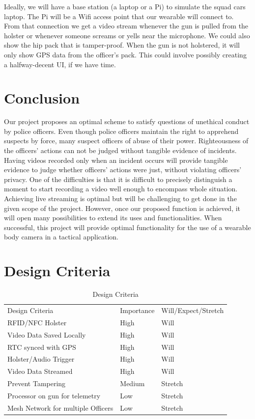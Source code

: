 \documentclass[12pt]{article}
\begin{document}
Ideally, we will have a base station (a laptop or a Pi) to simulate the squad
cars laptop. The Pi will be a Wifi access point that our wearable will connect
to. From that connection we get a video stream whenever the gun is pulled from
the holster or whenever someone screams or yells near the microphone. We could
also show the hip pack that is tamper-proof. When the gun is not holstered, it
will only show GPS data from the officer’s pack. This could involve possibly
creating a halfway-decent UI, if we have time.

\section{Conclusion}

Our project proposes an optimal scheme to satisfy questions of unethical
conduct by police officers. Even though police officers maintain the right to
apprehend suspects by force, many suspect officers of abuse of their power.
Righteousness of the officers’ actions can not be judged without tangible
evidence of incidents. Having videos recorded only when an incident occurs will
provide tangible evidence to judge whether officers’ actions were just, without
violating officers’ privacy. One of the difficulties is that it is difficult to
precisely distinguish a moment to start recording a video well enough to
encompass whole situation. Achieving live streaming is optimal but will be
challenging to get done in the given scope of the project. However, once our
proposed function is achieved, it will open many possibilities to extend its
uses and functionalities. When successful, this project will provide optimal
functionality for the use of a wearable body camera in a tactical application. 

\newpage




\newpage

\appendix
\section{Design Criteria}

\begin{table}[h!]
    \centering
    \caption{Design Criteria}
    \begin{tabular}{lll}
        Design Criteria & Importance & Will/Expect/Stretch\\
        RFID/NFC Holster & High & Will\\
        Video Data Saved Locally & High & Will\\
        RTC synced with GPS & High & Will\\
        Holster/Audio Trigger & High & Will\\
        Video Data Streamed & High & Will\\
        Prevent Tampering & Medium & Stretch\\
        Processor on gun for telemetry & Low & Stretch\\
        Mesh Network for multiple Officers & Low & Stretch\\
    \end{tabular}
\end{table}
\end{document}
